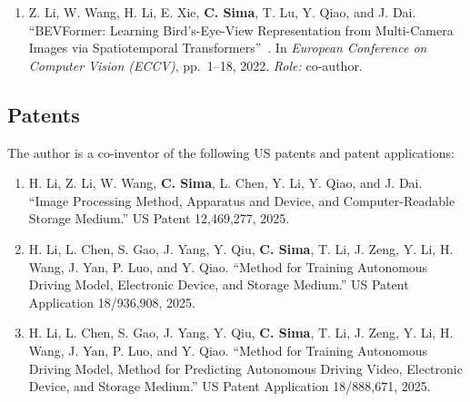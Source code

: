 \begin{enumerate}[label={\arabic*.}, leftmargin=2.4em, labelwidth=1.8em, labelsep=0.6em, align=left, itemsep=4pt, resume]
        In \emph{European Conference on Computer Vision (ECCV)}, LNCS 13698, pp.~550--567, 2022. \textbf{Oral presentation (top 2.3\%).}
        \emph{Role:} co-first author.
  \item Z. Li, W. Wang, H. Li, E. Xie, \textbf{C. Sima}, T. Lu, Y. Qiao, and J. Dai.
        ``BEVFormer: Learning Bird's-Eye-View Representation from Multi-Camera Images via Spatiotemporal Transformers''~\cite{li2022bevformer}.
        In \emph{European Conference on Computer Vision (ECCV)}, pp.~1--18, 2022.
        \emph{Role:} co-author.
\end{enumerate}

\subsection*{Patents}

\noindent The author is a co-inventor of the following US patents and patent applications:

\begin{enumerate}[label={P\arabic*.}, leftmargin=*, itemsep=4pt]
  \item H. Li, Z. Li, W. Wang, \textbf{C. Sima}, L. Chen, Y. Li, Y. Qiao, and J. Dai.
        ``Image Processing Method, Apparatus and Device, and Computer-Readable Storage Medium.''
        US Patent 12,469,277, 2025.
  \item H. Li, L. Chen, S. Gao, J. Yang, Y. Qiu, \textbf{C. Sima}, T. Li, J. Zeng, Y. Li, H. Wang, J. Yan, P. Luo, and Y. Qiao.
        ``Method for Training Autonomous Driving Model, Electronic Device, and Storage Medium.''
        US Patent Application 18/936,908, 2025.
  \item H. Li, L. Chen, S. Gao, J. Yang, Y. Qiu, \textbf{C. Sima}, T. Li, J. Zeng, Y. Li, H. Wang, J. Yan, P. Luo, and Y. Qiao.
        ``Method for Training Autonomous Driving Model, Method for Predicting Autonomous Driving Video, Electronic Device, and Storage Medium.''
        US Patent Application 18/888,671, 2025.
\end{enumerate}
